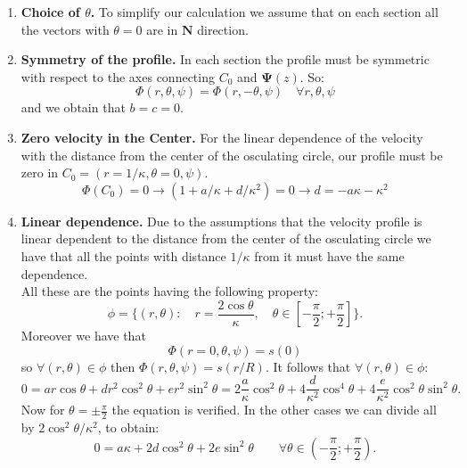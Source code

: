 \documentclass[a4paper]{report}
\begin{document}
	\begin{enumerate}	
	\item \textbf{Choice of $\theta$.} To simplify our calculation we assume that on each section all the vectors with $\theta=0$ are in $\mathbf{N}$ direction.
	\item \textbf{Symmetry of the profile.} In each section the profile must be symmetric with respect to the axes connecting $C_0 $ and $\boldsymbol{\Psi}(z)$. So:
	\begin{equation*}
		\Phi (r,\theta, \psi)= \Phi(r, -\theta, \psi) \quad \forall r,\theta,\psi
	\end{equation*}
and we obtain that $b=c=0$.
	\item\textbf{Zero velocity in the Center.} For the linear dependence of the velocity with the distance from the center of the osculating circle, our profile must be zero in $C_0 = (r=1/\kappa, \theta=0, \psi).$
	\begin{equation*}
	\Phi (C_0)= 0 \rightarrow (1+a/\kappa+d/\kappa^2)=0 	\rightarrow d=-a\kappa - \kappa^2
	\end{equation*}
	\item \textbf{Linear dependence.} Due to the assumptions that the velocity profile is linear dependent to the distance from the center of the osculating circle we have that all the points with distance $1/\kappa$ from it must have the same dependence.\\
All these are the points having the following property:
\begin{equation*}
\phi=\{(r,\theta): \quad r= \frac{2 \cos \theta}{\kappa}, \quad \theta \in [-\frac{\pi}{2}; +\frac{\pi}{2}] \}.
\end{equation*}
Moreover we have that
\begin{equation*}
\Phi(r=0,\theta,\psi)= s(0)
\end{equation*}
so $\forall (r,\theta) \in \phi$ then $\Phi(r,\theta, \psi)= s(r/R)$. It follows that $\forall (r,\theta) \in \phi$:
\begin{equation*}
0 = a r \cos \theta + d r^2 \cos^2 \theta + e r^2  \sin^2 \theta = 2 \frac{a}{\kappa} \cos^2 \theta + 4 \frac{d}{\kappa^2} \cos^4 \theta + 4 \frac{e}{\kappa^2} \cos^2 \theta \sin^2 \theta .
\end{equation*}
Now for $\theta=\pm \frac{\pi}{2}$ the equation is verified. In the other cases we can divide all by $2 \cos^2 \theta / \kappa^2$, to obtain:
\begin{equation*}
0= a \kappa + 2 d \cos^2 \theta + 2 e \sin^2 \theta \quad \quad \forall 	\theta  \in (-\frac{\pi}{2};+\frac{\pi}{2}).

\end{equation*}
\end{enumerate}
\end{document}
